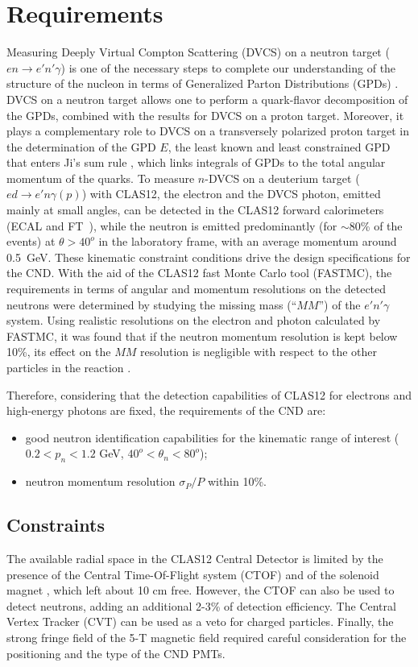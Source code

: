 \section{Requirements}

Measuring Deeply Virtual Compton Scattering (DVCS) on a neutron target ($en \to e' n' \gamma$) is one of the necessary steps to complete
our understanding of the structure of the nucleon in terms of Generalized Parton Distributions (GPDs) \cite{Mueller:1998fv,Ji:1996ek,Radyushkin:1996nd}.
DVCS on a neutron target allows one to perform a quark-flavor decomposition of the GPDs, combined with the results for DVCS on a proton target.
Moreover, it plays a complementary role to DVCS on a transversely polarized proton target in the determination of the GPD $E$, the least known and least
constrained GPD that enters Ji's sum rule \cite{Ji:1996ek}, which links integrals of GPDs to the total angular momentum of the quarks.
To measure $n$-DVCS on a deuterium target ($ed\to e'n\gamma(p)$) with CLAS12, the electron and the DVCS photon, emitted mainly at small angles, can be detected in the CLAS12 forward calorimeters (ECAL \cite{ec-nim} and FT~\cite{ft-nim}), while the neutron is emitted predominantly (for $\sim 80$\% of the events) at $\theta> 40^o$ in the laboratory frame, with an average momentum around 0.5~GeV.
These kinematic constraint conditions drive the design specifications for the CND. 
With the aid of the CLAS12 fast Monte Carlo tool (FASTMC), the requirements in terms of angular and momentum resolutions on the detected neutrons were determined by studying the missing mass (``$MM$'') of the $e'n'\gamma$ system.
Using realistic resolutions on the electron and photon calculated by FASTMC, it was found that if the neutron momentum resolution is kept below 10\%, its effect on the $MM$ resolution is negligible with respect to the other particles in the reaction \cite{Niccolai:2018qzm}. 

Therefore, considering that the detection capabilities of CLAS12 for electrons and high-energy photons are fixed, the requirements of the CND are:
\begin{itemize}
\item{good neutron identification capabilities for the kinematic range of interest ($0.2<p_n<1.2$ GeV, $40^o<\theta_n<80^o$);}
\item{neutron momentum resolution $\sigma_P/P$ within 10\%.}
\end{itemize}

\subsection{Constraints}
\label{sect_constraints}
The available radial space in the CLAS12 Central Detector is limited by the presence of the Central Time-Of-Flight system (CTOF) \cite{ctof-nim} and of the solenoid magnet \cite{magnets-nim}, which left about 10 cm free. 
However, the CTOF can also be used to detect neutrons, adding an additional 2-3\% of detection efficiency. 
The Central Vertex Tracker (CVT) \cite{svt-nim,mm-nim} can be used as a veto for charged particles.
Finally, the strong fringe field of the 5-T magnetic field required careful consideration for the positioning and the type of the CND PMTs.


